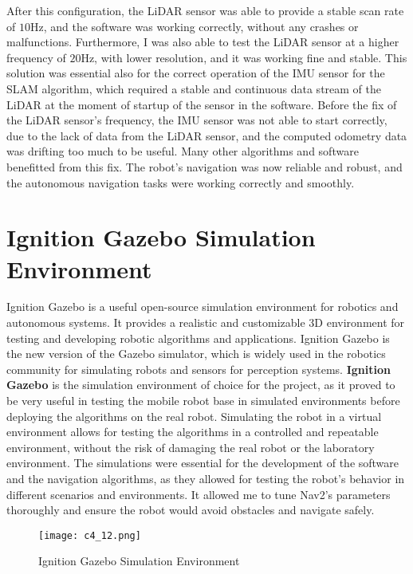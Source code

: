 After this configuration, the LiDAR sensor was able to provide a stable scan rate of $10$Hz,
and the software was working correctly, without any crashes or malfunctions.
Furthermore, I was also able to test the LiDAR sensor at a higher frequency of $20$Hz, 
with lower resolution, and it was working fine and stable.
This solution was essential also for the correct operation of the IMU sensor for the SLAM algorithm, which required
a stable and continuous data stream of the LiDAR at the moment of startup of the sensor in the software. Before the 
fix of the LiDAR sensor's frequency, the IMU sensor was not able to start correctly, due to the lack of data
from the LiDAR sensor, and the computed odometry data was drifting too much to be useful.
Many other algorithms and software benefitted from this fix. The robot's navigation was now reliable and robust,
and the autonomous navigation tasks were working correctly and smoothly.


\section{Ignition Gazebo Simulation Environment}

Ignition Gazebo is a useful open-source simulation environment for robotics and autonomous systems.
It provides a realistic and customizable 3D environment for testing and developing robotic algorithms and applications.
Ignition Gazebo is the new version of the Gazebo simulator, which is widely used in the robotics community for simulating
robots and sensors for perception systems. \textbf{Ignition Gazebo} is the simulation environment of choice for the project,
as it proved to be very useful in testing the mobile robot base in simulated environments before deploying the algorithms
on the real robot. Simulating the robot in a virtual environment allows for testing the algorithms in 
a controlled and repeatable environment, without the risk of damaging the real robot or the laboratory environment.
The simulations were essential for the development of the software and the navigation algorithms, 
as they allowed for testing
the robot's behavior in different scenarios and environments. It allowed me to tune Nav2's parameters
thoroughly and ensure the robot would avoid obstacles and navigate safely.

\begin{figure}[t]
    \centering
    \texttt{[image: c4\_12.png]}
    \caption{Ignition Gazebo Simulation Environment}
    \label{fig:ignition}
\end{figure}

